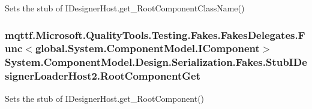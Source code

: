 Sets the stub of I\-Designer\-Host.\-get\-\_\-\-Root\-Component\-Class\-Name()

\hypertarget{class_system_1_1_component_model_1_1_design_1_1_serialization_1_1_fakes_1_1_stub_i_designer_loader_host2_a3a6f557cd285c62a5bd7406eda4d52dd}{
\subsubsection[{Root\-Component\-Get}]{\setlength{\rightskip}{0pt plus 5cm}mqttf.\-Microsoft.\-Quality\-Tools.\-Testing.\-Fakes.\-Fakes\-Delegates.\-Func$<$global.\-System.\-Component\-Model.\-I\-Component$>$ System.\-Component\-Model.\-Design.\-Serialization.\-Fakes.\-Stub\-I\-Designer\-Loader\-Host2.\-Root\-Component\-Get}}\label{class_system_1_1_component_model_1_1_design_1_1_serialization_1_1_fakes_1_1_stub_i_designer_loader_host2_a3a6f557cd285c62a5bd7406eda4d52dd}


Sets the stub of I\-Designer\-Host.\-get\-\_\-\-Root\-Component()

